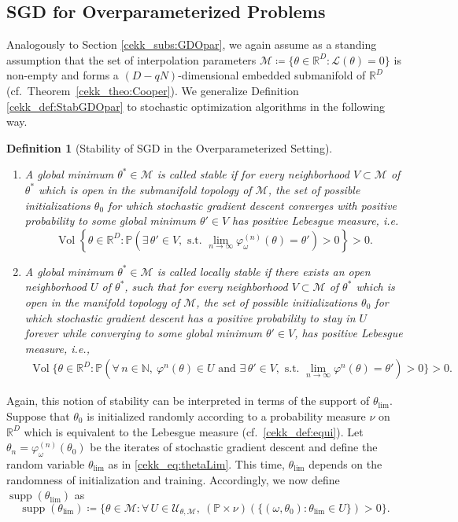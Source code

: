 \documentclass[10pt]{article}
\newcommand{\R}{{\mathbb R}}
\def\R{\mathbb{R}}
\newtheorem{definition}[theorem]{Definition}
\begin{document}
\subsection{SGD for Overparameterized Problems}\label{cekk_sec:SGDOver}
Analogously to Section \ref{cekk_subs:GDOpar}, we again assume as a standing assumption that the set of interpolation parameters $\mathcal M \coloneqq \{\theta \in \R^D: \mathcal L(\theta) = 0 \}$ is non-empty and forms a $(D-qN)$-dimensional embedded submanifold of $\R^D$ (cf.~Theorem~\ref{cekk_theo:Cooper}). We generalize Definition \ref{cekk_def:StabGDOpar} to stochastic optimization algorithms in the following way.
\begin{definition}
	[Stability of SGD in the Overparameterized Setting]~\label{cekk_def:StabSGD}
	\begin{enumerate}
		\item[(i)] A global minimum $\theta^*\in \mathcal M$ is called \emph{stable} if for every neighborhood $V\subset \mathcal M$ of $\theta^*$ which is open in the submanifold topology of $\mathcal M$, the set of possible initializations $\theta_0$ for which stochastic gradient descent converges with positive probability to some global minimum $\theta' \in V$ has positive Lebesgue measure, i.e.
		$$\operatorname{Vol}\left\{\theta \in \R^D :\mathbb P\left(\exists\, \theta' \in V, \text{ s.t. } \lim_{n \to \infty} \varphi^{(n)}_\omega(\theta) = \theta'\right) > 0\right\}>0.$$
		\item[(ii)] A global minimum $\theta^*\in \mathcal M$ is called \emph{locally stable} if there exists an open neighborhood $U$ of $\theta^*$, such that for every neighborhood $V\subset \mathcal M$ of $\theta^*$ which is open in the manifold topology of $\mathcal M$, the set of possible initializations $\theta_0$ for which stochastic gradient descent has a positive probability to stay in $U$ forever while converging to some global minimum $\theta' \in V$, has positive Lebesgue measure, i.e.,
		\begin{multline*}
			\operatorname{Vol}\bigg\{\theta \in \R^D : \mathbb P \left(\forall\, n \in \mathbb N, ~\varphi^n(\theta) \in U \text{ and }\exists\, \theta' \in V, \text{ s.t. } \lim_{n \to \infty} \varphi^n(\theta) = \theta'\right) > 0\bigg\}>0.
		\end{multline*}
	\end{enumerate}
\end{definition}

Again, this notion of stability can be interpreted in terms of the support of $\theta_{\lim}$. Suppose that $\theta_0$ is initialized randomly according to a probability measure $\nu$ on $\R^D$ which is equivalent to the Lebesgue measure (cf.~\eqref{cekk_def:equi}). Let $\theta_n = \varphi_\omega^{(n)}(\theta_0)$ be the iterates of stochastic gradient descent and define the random variable $\theta_{\lim}$ as in \eqref{cekk_eq:thetaLim}. This time, $\theta_{\lim}$ depends on the randomness of initialization and training. Accordingly, we now define $\operatorname{supp}(\theta_{\lim})$ as
$$\operatorname{supp}(\theta_{\lim}) \coloneqq \{\theta \in \mathcal M: \forall\, U \in \mathcal U_{\theta, \mathcal M},~ (\mathbb P \times \nu)(\{(\omega,\theta_0) : \theta_{\lim} \in U\}) > 0\}.$$
\end{document}
